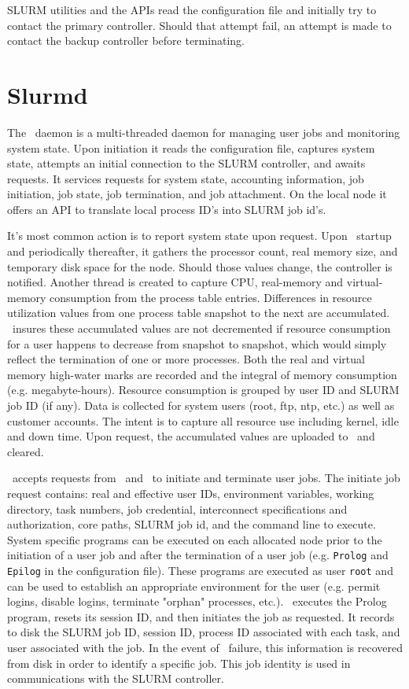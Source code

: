 SLURM utilities and the APIs read the configuration file 
and initially try to contact the primary controller. 
Should that attempt fail, an attempt is made to contact the 
backup controller before terminating.

\section{Slurmd}

The \slurmd\ daemon is a multi-threaded daemon for managing
user jobs and monitoring system state.  Upon initiation it reads
the configuration file, captures system state, attempts an initial
connection to the SLURM controller, and awaits requests.
It services requests for system state, accounting information,
job initiation, job state, job termination, and job attachment. On the
local node it offers an API to translate local process ID's into
SLURM job id's. 

It's most common action is to report system state upon request. Upon
\slurmd\ startup and periodically thereafter, it gathers the processor
count, real memory size, and temporary disk space for the node. Should
those values change, the controller is notified.  Another thread is
created to capture CPU, real-memory and virtual-memory consumption from
the process table entries.  Differences in resource utilization values
from one process table snapshot to the next are accumulated. \slurmd\ 
insures these accumulated values are not decremented if resource
consumption for a user happens to decrease from snapshot to snapshot,
which would simply reflect the termination of one or more processes.
Both the real and virtual memory high-water marks are recorded and
the integral of memory consumption (e.g. megabyte-hours).  Resource
consumption is grouped by user ID and SLURM job ID (if any). Data
is collected for system users (root, ftp, ntp, etc.) as well as
customer accounts. The intent is to capture all resource use including
kernel, idle and down time.  Upon request, the accumulated values are
uploaded to \slurmctld\ and cleared.  

\slurmd\ accepts requests from \srun\ and \slurmctld\ to initiate
and terminate user jobs. The initiate job request contains: 
real and effective user IDs, environment variables, working directory, task
numbers, job credential, interconnect specifications and authorization,
core paths, SLURM job id, and the command line to execute. 
System specific programs can be executed on each allocated 
node prior to the initiation of a user job and after the termination of a 
user job (e.g. {\tt Prolog} and {\tt Epilog} in the configuration file).
These programs are executed as user {\tt root} and can be used to establish
an appropriate environment for the user (e.g. permit logins, disable
logins, terminate "orphan" processes, etc.).  
\slurmd\ executes the Prolog program, resets its
session ID, and then initiates the job as requested. It records to
disk the SLURM job ID, session ID, process ID associated with each task,
and user associated with the job.  In the event of \slurmd\ failure,
this information is recovered from disk in order to identify a
specific job. This  job identity is used in communications with
the SLURM controller.

